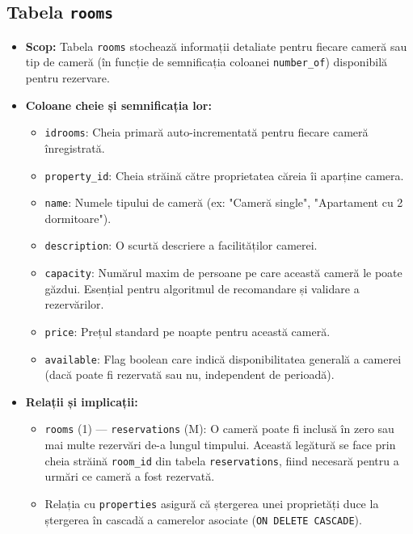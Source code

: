 \documentclass[12pt, a4paper, oneside, romanian]{teza-upb}
\begin{document}
\subsection{Tabela \texttt{rooms}}
\begin{itemize}
    \item \textbf{Scop:} Tabela \texttt{rooms} stochează informații detaliate pentru fiecare cameră sau tip de cameră (în funcție de semnificația coloanei \texttt{number\_of}) disponibilă pentru rezervare.

    \item \textbf{Coloane cheie și semnificația lor:}
    \begin{itemize}
        \item \texttt{idrooms}: Cheia primară auto-incrementată pentru fiecare cameră înregistrată.
        \item \texttt{property\_id}: Cheia străină către proprietatea căreia îi aparține camera.
        \item \texttt{name}: Numele tipului de cameră (ex: "Cameră single", "Apartament cu 2 dormitoare").
        \item \texttt{description}: O scurtă descriere a facilităților camerei.
        \item \texttt{capacity}: Numărul maxim de persoane pe care această cameră le poate găzdui. Esențial pentru algoritmul de recomandare și validare a rezervărilor.
        \item \texttt{price}: Prețul standard pe noapte pentru această cameră.
        \item \texttt{available}: Flag boolean care indică disponibilitatea generală a camerei (dacă poate fi rezervată sau nu, independent de perioadă).
    \end{itemize}

    \item \textbf{Relații și implicații:}
    \begin{itemize}
        \item \texttt{rooms} (1) --- \texttt{reservations} (M): O cameră poate fi inclusă în zero sau mai multe rezervări de-a lungul timpului. Această legătură se face prin cheia străină \texttt{room\_id} din tabela \texttt{reservations}, fiind necesară pentru a urmări ce cameră a fost rezervată.
        \item Relația cu \texttt{properties} asigură că ștergerea unei proprietăți duce la ștergerea în cascadă a camerelor asociate (\texttt{ON DELETE CASCADE}).
    \end{itemize}
\end{itemize}
\end{document}
